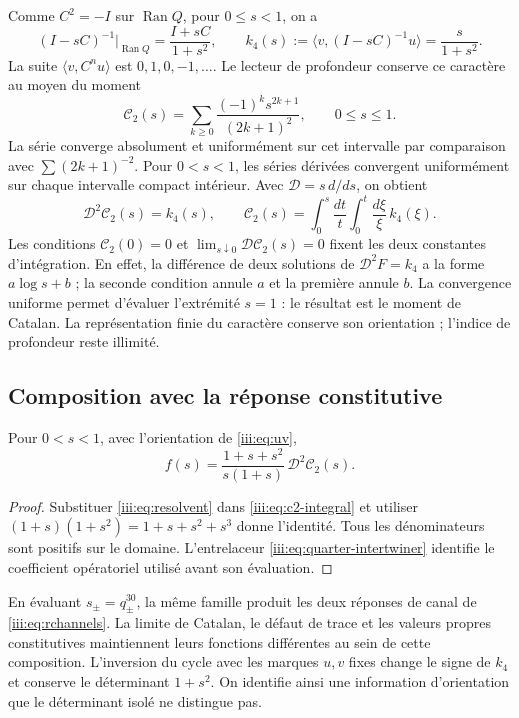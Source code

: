 Comme $C^2=-I$ sur $\operatorname{Ran}Q$, pour $0\leq s<1$, on a
\begin{equation}
 (I-sC)^{-1}\big|_{\operatorname{Ran}Q}=\frac{I+sC}{1+s^2},
 \qquad k_4(s):=\langle v,(I-sC)^{-1}u\rangle=\frac{s}{1+s^2}.
 \label{iii:eq:resolvent}
\end{equation}
La suite $\langle v,C^nu\rangle$ est $0,1,0,-1,\ldots$. Le lecteur
de profondeur conserve ce caractère au moyen du moment
\begin{equation}
 \mathcal C_2(s)=\sum_{k\geq0}\frac{(-1)^ks^{2k+1}}{(2k+1)^2},
 \qquad 0\leq s\leq1.
 \label{iii:eq:c2}
\end{equation}
La série converge absolument et uniformément sur cet intervalle par
comparaison avec $\sum(2k+1)^{-2}$. Pour $0<s<1$, les séries dérivées
convergent uniformément sur chaque intervalle compact intérieur. Avec
$\mathcal D=s\,d/ds$, on obtient
\begin{equation}
 \mathcal D^2\mathcal C_2(s)=k_4(s),\qquad
 \mathcal C_2(s)=\int_0^s\frac{dt}{t}\int_0^t\frac{d\xi}{\xi}\,k_4(\xi).
 \label{iii:eq:c2-integral}
\end{equation}
Les conditions $\mathcal C_2(0)=0$ et
$\lim_{s\downarrow0}\mathcal D\mathcal C_2(s)=0$ fixent les deux constantes
d’intégration. En effet, la différence de deux solutions de
$\mathcal D^2F=k_4$ a la forme $a\log s+b$ ; la seconde condition
annule $a$ et la première annule $b$.
La convergence uniforme permet d’évaluer l’extrémité $s=1$ : le résultat est
le moment de Catalan. La représentation finie du caractère conserve son
orientation ; l’indice de profondeur reste illimité.

\subsection{Composition avec la réponse constitutive}

\begin{theorem}
Pour $0<s<1$, avec l’orientation de \eqref{iii:eq:uv},
\begin{equation}
 f(s)=\frac{1+s+s^2}{s(1+s)}\,\mathcal D^2\mathcal C_2(s).
 \label{iii:eq:catalan-vacuum}
\end{equation}
\end{theorem}
\begin{proof}
Substituer \eqref{iii:eq:resolvent} dans \eqref{iii:eq:c2-integral} et utiliser
$(1+s)(1+s^2)=1+s+s^2+s^3$ donne l’identité. Tous les dénominateurs sont
positifs sur le domaine. L’entrelaceur \eqref{iii:eq:quarter-intertwiner}
identifie le coefficient opératoriel utilisé avant son évaluation.
\end{proof}

En évaluant $s_\pm=q_\pm^{30}$, la même famille produit les deux réponses
de canal de \eqref{iii:eq:rchannels}. La limite de Catalan, le défaut de
trace et les valeurs propres constitutives maintiennent leurs fonctions différentes
au sein de cette composition. L’inversion du cycle avec les marques $u,v$
fixes change le signe de $k_4$ et conserve le déterminant $1+s^2$.
On identifie ainsi une information d’orientation que le déterminant
isolé ne distingue pas.
